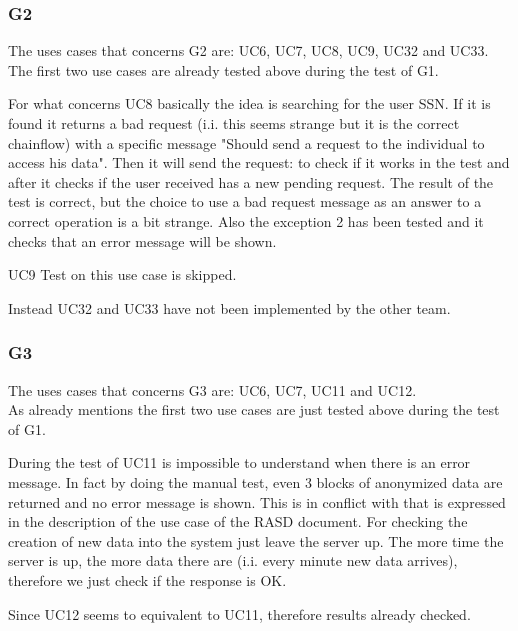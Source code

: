 \subsubsection{G2}
The uses cases that concerns G2 are: UC6, UC7, UC8, UC9, UC32 and UC33.  \\

The first two use cases are already tested above during the test of G1.

\par
For what concerns UC8 basically the idea is searching for the user SSN. If it is found it returns a bad request (i.i. this seems strange but it is the correct chainflow) with a specific message "Should send a request to the individual to access his data". Then it will send the request: to check if it works in the test and after it checks if the user received has a new pending request.
The result of the test is correct, but the choice to use a bad request message as an answer to a correct operation is a bit strange. Also the exception 2 has been tested and it checks that an error message will be shown.

\par
UC9 Test on this use case is skipped.

\par
Instead UC32 and UC33 have not been implemented by the other team.


\subsubsection{G3}
The uses cases that concerns G3 are: UC6, UC7, UC11 and UC12.  \\
As already mentions the first two use cases are just tested above during the test of G1.

\par
During the test of UC11 is impossible to understand when there is an error message. In fact by doing the manual test, even 3 blocks of anonymized data are returned and no error message is shown. This is in conflict with that is expressed in the description of the use case of the RASD document. For checking the creation of new data into the system just leave the server up. The more time the server is up, the more data there are (i.i. every minute new data arrives), therefore we just check if the response is OK.

\par
Since UC12 seems to equivalent to UC11, therefore results already checked.


